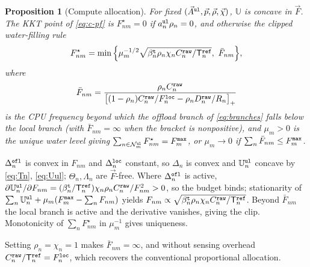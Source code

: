 \documentclass[journal]{IEEEtran}
\newtheorem{proposition}{Proposition}
\begin{document}
\begin{proposition}[Compute allocation]\label{prop:F}
For fixed $(\vec{A}^{\tt ul},\vec{p},\vec{\rho},\vec{\chi})$, $\mathbb{U}$ is concave in $\vec{F}$. The KKT point of \eqref{eq:c-pf} is $F_{nm}^\star=0$ if $a_n^{\tt ul}\rho_n=0$, and otherwise the clipped water-filling rule
\begin{equation}
F_{nm}^\star
=\min\Big\{\mu_m^{-1/2}\sqrt{\beta_n^{\tt t}\rho_n\chi_n C_n^{\tt raw}/\mathsf{T}_n^{\tt ref}},\ \bar F_{nm}\Big\},
\label{eq:Fstar}
\end{equation}
where
\begin{equation}
\bar F_{nm}
=\frac{\rho_n C_n^{\tt raw}}
{\big[(1-\rho_n)C_n^{\tt raw}/F_n^{\tt loc}-\rho_n D_n^{\tt raw}/R_n\big]_+}
\label{eq:Fbar}
\end{equation}
is the {CPU frequency} beyond which the offload branch of \eqref{eq:branches} falls below the local branch (with $\bar F_{nm}=\infty$ when the bracket is nonpositive), and $\mu_m>0$ is the unique water level giving $\sum_{n\in\mathcal{N}_m^{\tt ul}}F_{nm}^\star=F_m^{\tt max}$, or $\mu_m\to0$ if $\sum_n\bar F_{nm}\le F_m^{\tt max}$.
\end{proposition}
\begin{IEEEproof}
$\Delta_n^{\tt ofl}$ is convex in $F_{nm}$ and $\Delta_n^{\tt loc}$ constant, so $\Delta_n$ is convex and $\mathbb{U}_n^{\tt ul}$ concave by \eqref{eq:Tn}, \eqref{eq:Uul}; $\Theta_n,\Lambda_n$ are $\vec{F}$-free. Where $\Delta_n^{\tt ofl}$ is active, $\partial\mathbb{U}_n^{\tt ul}/\partial F_{nm}=(\beta_n^{\tt t}/\mathsf{T}_n^{\tt ref})\chi_n\rho_n C_n^{\tt raw}/F_{nm}^2>0$, so the budget binds; stationarity of $\sum_n\mathbb{U}_n^{\tt ul}+\mu_m(F_m^{\tt max}-\sum_n F_{nm})$ yields $F_{nm}\propto\sqrt{\beta_n^{\tt t}\rho_n\chi_n C_n^{\tt raw}/\mathsf{T}_n^{\tt ref}}$. Beyond $\bar F_{nm}$ the local branch is active and the derivative vanishes, giving the clip. Monotonicity of $\sum_n F_{nm}^\star$ in $\mu_m^{-1}$ gives uniqueness.
\end{IEEEproof}
Setting $\rho_n=\chi_n=1$ makes $\bar F_{nm}=\infty$, and without sensing overhead $C_n^{\tt raw}/\mathsf{T}_n^{\tt ref}=F_n^{\tt loc}$, which recovers the conventional proportional allocation.
\end{document}
